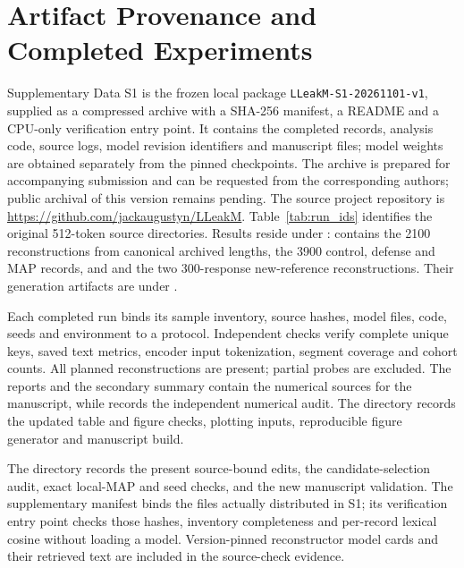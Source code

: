 \documentclass[electronics,article,submit,pdftex,moreauthors]{Definitions/mdpi}
\begin{document}
\appendixstart
\appendix
\section{Artifact Provenance and Completed Experiments}\label{app:runs}
Supplementary Data S1 is the frozen local package \texttt{LLeakM-S1-20261101-v1}, supplied as a compressed archive with a SHA-256 manifest, a README and a CPU-only verification entry point. It contains the completed records, analysis code, source logs, model revision identifiers and manuscript files; model weights are obtained separately from the pinned checkpoints. The archive is prepared for accompanying submission and can be requested from the corresponding authors; public archival of this version remains pending. The source project repository is \url{https://github.com/jackaugustyn/LLeakM}. Table~\ref{tab:run_ids} identifies the original 512-token source directories. Results reside under :  contains the 2100 reconstructions from canonical archived lengths,  the 3900 control, defense and MAP records, and  and  the two 300-response new-reference reconstructions. Their generation artifacts are under .

Each completed run binds its sample inventory, source hashes, model files, code, seeds and environment to a protocol. Independent checks verify complete unique keys, saved text metrics, encoder input tokenization, segment coverage and cohort counts. All planned reconstructions are present; partial probes are excluded. The  reports and the secondary summary contain the numerical sources for the manuscript, while  records the independent numerical audit. The  directory records the updated table and figure checks, plotting inputs, reproducible figure generator and manuscript build.

The  directory records the present source-bound edits, the candidate-selection audit, exact local-MAP and seed checks, and the new manuscript validation. The supplementary manifest binds the files actually distributed in S1; its verification entry point checks those hashes, inventory completeness and per-record lexical cosine without loading a model. Version-pinned reconstructor model cards and their retrieved text are included in the source-check evidence.
\end{document}
